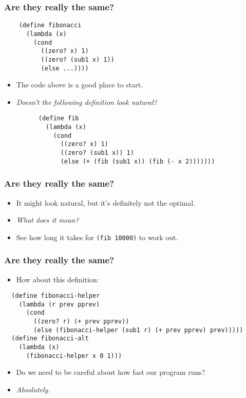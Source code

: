 \begin{frame}[fragile]
  \frametitle{Are they really the same?}
  \begin{verbatim}
    (define fibonacci
      (lambda (x)
        (cond
          ((zero? x) 1)
          ((zero? (sub1 x) 1))
          (else ...))))
  \end{verbatim}
  \begin{itemize}
    \item The code above is a good place to start.
    \pause
    \item \emph{Doesn't the following definition look natural?}
    \begin{verbatim}
      (define fib
        (lambda (x)
          (cond
            ((zero? x) 1)
            ((zero? (sub1 x)) 1)
            (else (+ (fib (sub1 x)) (fib (- x 2)))))))
    \end{verbatim}
  \end{itemize}
\end{frame}

\begin{frame}[fragile]
  \frametitle{Are they really the same?}
  \begin{itemize}
    \item It might look natural, but it's definitely not the optimal.
    \item \emph{What does it mean?}
    \pause
    \item See how long it takes for \texttt{(fib 10000)} to work out.
  \end{itemize}
\end{frame}

\begin{frame}[fragile]
  \frametitle{Are they really the same?}
  \begin{itemize}
    \item How about this definition:
  \end{itemize}
  \begin{verbatim}
  (define fibonacci-helper
    (lambda (r prev pprev)
      (cond
        ((zero? r) (+ prev pprev))
        (else (fibonacci-helper (sub1 r) (+ prev pprev) prev)))))
  (define fibonacci-alt
    (lambda (x)
      (fibonacci-helper x 0 1)))
  \end{verbatim}
  \begin{itemize}
    \pause
    \item Do we need to be careful about how fast our program runs?
    \pause
    \item \emph{Absolutely.}
  \end{itemize}
\end{frame}
